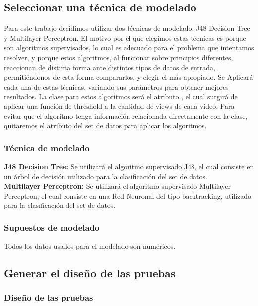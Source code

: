 \subsection{Seleccionar una técnica de modelado}

Para este trabajo decidimos utilizar dos técnicas de modelado, J48 Decision Tree
y Multilayer Perceptron. El motivo por el que elegimos estas técnicas es porque
son algoritmos supervisados, lo cual es adecuado para el problema que intentamos
resolver, y porque estos algoritmos, al funcionar sobre principios diferentes,
reaccionan de distinta forma ante distintos tipos de datos de entrada,
permitiéndonos de esta forma compararlos, y elegir el más apropiado.
Se Aplicará cada una de estas técnicas, variando sus parámetros
para obtener mejores resultados.
La clase para estos algoritmos será el atributo , el cual
surgirá de aplicar una función de threshold a la cantidad de views de cada
video. Para evitar que el algoritmo tenga información relacionada directamente
con la clase, quitaremos el atributo  del set de datos para aplicar
los algoritmos.

    \subsubsection{Técnica de modelado}
      \textbf{J48 Decision Tree:} Se utilizará el algoritmo supervisado J48, el cual
      consiste en un árbol de decisión utilizado para la clasificación del set
      de datos.\\
      \textbf{Multilayer Perceptron:} Se utilizará el algoritmo supervisado
      Multilayer Perceptron, el cual consiste en una Red Neuronal del tipo
      backtracking, utilizado para la clasificación del set de datos.

    \subsubsection{Supuestos de modelado}
        Todos los datos usados para el modelado son numéricos.

\subsection{Generar el diseño de las pruebas}
    \subsubsection{Diseño de las pruebas}

